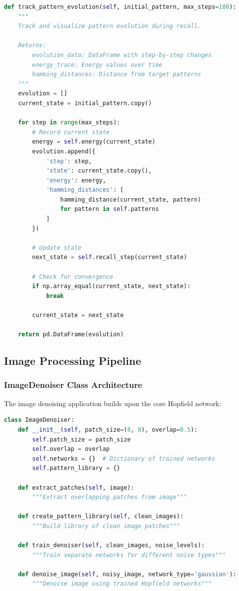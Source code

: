 \documentclass[11pt,a4paper]{article}
\begin{document}
\begin{lstlisting}[language=Python, caption=Pattern Evolution Tracking]
def track_pattern_evolution(self, initial_pattern, max_steps=100):
    """
    Track and visualize pattern evolution during recall.
    
    Returns:
        evolution_data: DataFrame with step-by-step changes
        energy_trace: Energy values over time
        hamming_distances: Distance from target patterns
    """
    evolution = []
    current_state = initial_pattern.copy()
    
    for step in range(max_steps):
        # Record current state
        energy = self.energy(current_state)
        evolution.append({
            'step': step,
            'state': current_state.copy(),
            'energy': energy,
            'hamming_distances': [
                hamming_distance(current_state, pattern) 
                for pattern in self.patterns
            ]
        })
        
        # Update state
        next_state = self.recall_step(current_state)
        
        # Check for convergence
        if np.array_equal(current_state, next_state):
            break
            
        current_state = next_state
    
    return pd.DataFrame(evolution)
\end{lstlisting}

\subsection{Image Processing Pipeline}

\subsubsection{ImageDenoiser Class Architecture}

The image denoising application builds upon the core Hopfield network:

\begin{lstlisting}[language=Python, caption=Image Denoising Pipeline]
class ImageDenoiser:
    def __init__(self, patch_size=(8, 8), overlap=0.5):
        self.patch_size = patch_size
        self.overlap = overlap
        self.networks = {}  # Dictionary of trained networks
        self.pattern_library = {}
        
    def extract_patches(self, image):
        """Extract overlapping patches from image"""
        
    def create_pattern_library(self, clean_images):
        """Build library of clean image patches"""
        
    def train_denoiser(self, clean_images, noise_levels):
        """Train separate networks for different noise types"""
        
    def denoise_image(self, noisy_image, network_type='gaussian'):
        """Denoise image using trained Hopfield networks"""
\end{lstlisting}
\end{document}
